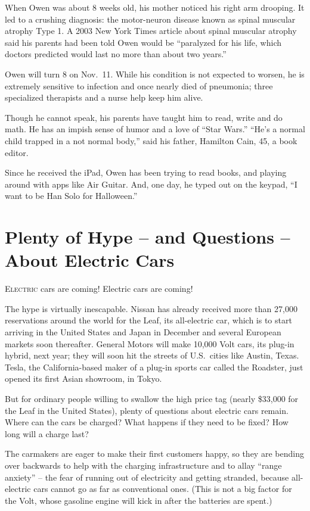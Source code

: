 ﻿\documentclass[12pt]{article}
\begin{document}
When Owen was about 8 weeks old, his mother noticed his right arm drooping. It led to a crushing
diagnosis: the motor-neuron disease known as spinal muscular atrophy Type 1. A 2003 New York Times
article about spinal muscular atrophy said his parents had been told Owen would be ``paralyzed for
his life, which doctors predicted would last no more than about two years.''

Owen will turn 8 on Nov.~11. While his condition is not expected to worsen, he is extremely
sensitive to infection and once nearly died of pneumonia; three specialized therapists and a nurse
help keep him alive.

Though he cannot speak, his parents have taught him to read, write and do math. He has an impish
sense of humor and a love of ``Star Wars.'' ``He's a normal child trapped in a not normal body,''
said his father, Hamilton Cain, 45, a book editor.

Since he received the iPad, Owen has been trying to read books, and playing around with apps like
Air Guitar. And, one day, he typed out on the keypad, ``I want to be Han Solo for Halloween.''

\section{Plenty of Hype -- and Questions -- About Electric Cars}

\lettrine{E}{lectric} cars are coming! Electric cars are coming!

The hype is virtually inescapable. Nissan has already received more than 27,000 reservations around
the world for the Leaf, its all-electric car, which is to start arriving in the United States and
Japan in December and several European markets soon thereafter. General Motors will make 10,000 Volt
cars, its plug-in hybrid, next year; they will soon hit the streets of U.S.~cities like Austin,
Texas. Tesla, the California-based maker of a plug-in sports car called the Roadster, just opened
its first Asian showroom, in Tokyo.

But for ordinary people willing to swallow the high price tag (nearly \$33,000 for the Leaf in the
United States), plenty of questions about electric cars remain. Where can the cars be charged? What
happens if they need to be fixed? How long will a charge last?

The carmakers are eager to make their first customers happy, so they are bending over backwards to
help with the charging infrastructure and to allay ``range anxiety'' -- the fear of running out of
electricity and getting stranded, because all-electric cars cannot go as far as conventional ones.
(This is not a big factor for the Volt, whose gasoline engine will kick in after the batteries are
spent.)
\end{document}
